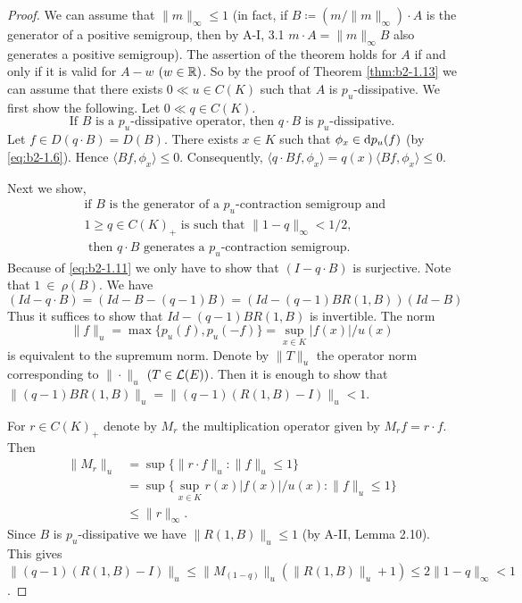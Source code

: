 \begin{proof}
We can assume that $\|m\|_{\infty} \leq 1$ (in fact, if $B \coloneqq (m/\|m\|_{\infty}) \cdot A$ is the generator of a positive semigroup, then by A-I, 3.1 $m \cdot A = \|m\|_{\infty}B$ also generates a positive semigroup).
The assertion of the theorem holds for $A$ if and only if it is valid for $A - w$ $(w \in \mathbb{R})$.
So by the proof of Theorem \ref{thm:b2-1.13} we can assume that there exists $0 \ll u \in C(K)$ such that $A$ is $p_{u}$-dissipative.
We first show the following. Let $0 \ll q \in C(K)$.
\begin{equation}\label{eq:b2-1.11}
\text{If } B \text{ is a } p_{u}\text{-dissipative operator, then } q \cdot B \text{ is } p_{u}\text{-dissipative.}
\end{equation}
Let $f \in D(q \cdot B) = D(B)$.
There exists $x \in K$ such that $\phi_{x} \in \mathop{}\!\mathrm{d}{p}_{u}(f)$ (by \eqref{eq:b2-1.6}). 
Hence $\langle Bf,\phi_{x} \rangle \leq 0$.
Consequently, $\langle q \cdot Bf,\phi_{x} \rangle = q(x)\langle Bf,\phi_{x} \rangle \leq 0$.

Next we show,
\begin{equation}  \label{eq:b2-1.12}
\begin{aligned}
&\text{if } B \text{ is the generator of a } p_{u}\text{-contraction semigroup and } \\
&1 \geq q \in C(K)_{+} \text{ is such that } \|1 - q\|_{\infty} < 1/2,  \\
&\text{ then } q \cdot B \text{ generates a } p_{u}\text{-contraction semigroup.}
\end{aligned}
\end{equation}
Because of \eqref{eq:b2-1.11} we only have to show that $(I - q \cdot B)$ is surjective. 
Note that $1~\in~\rho(B)$.
We have 
\[(Id - q \cdot B) = (Id - B - (q-1)B) = (Id - (q-1)BR(1,B))(Id - B)
\]
Thus it suffices to show that $Id - (q-1)BR(1,B)$ is invertible.
The norm 
\[
\|f\|_{u} = \max\{p_{u}(f), p_{u}(-f)\} = \sup_{x \in K} |f(x)|/u(x)
\]
is equivalent to the supremum norm.
Denote by $\|T\|_{u}$ the operator norm corresponding to $\|\cdot\|_{u}$ $(T \in \mathcal{L}(E))$.
Then it is enough to show that $\|(q-1)BR(1,B)\|_{u} = \|(q-1)(R(1,B) - I)\|_{u} < 1$.

For $r \in C(K)_{+}$ denote by $M_{r}$ the multiplication operator given by $M_{r}f = r \cdot f$.
Then 
\begin{align*}
	    \|M_{r}\|_{u} &= \sup\{\|r \cdot f\|_{u} \colon \|f\|_{u} \leq 1\} \\
	              &= \sup\{\sup_{x \in K} r(x)|f(x)|/u(x) \colon \|f\|_{u} \leq 1\}  \\
	              &\leq \|r\|_{\infty}.
\end{align*}
Since $B$ is $p_{u}$-dissipative we have $\|R(1,B)\|_{u} \leq 1$ (by A-II, Lemma 2.10).
This gives $\|(q-1)(R(1,B) - I)\|_{u} \leq \|M_{(1-q)}\|_{u}(\|R(1,B)\|_{u} + 1) \leq 2\|1 - q\|_{\infty} < 1$.


\end{proof}

